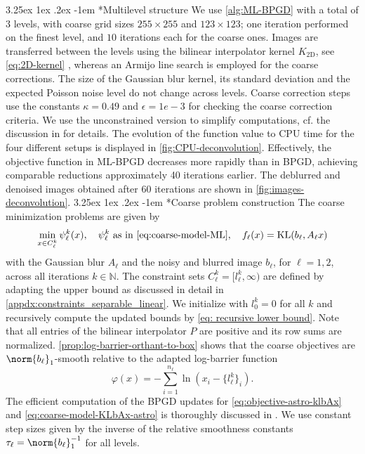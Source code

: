 \documentclass[11pt,reqno]{amsart}
\makeatletter
\numberwithin{equation}{section}
\numberwithin{figure}{section}
\theoremstyle{plain}
\theoremstyle{definition}
\newcommand{\N}{\mathbb{N}}
\newcommand{\vphi}{\varphi}
\DeclareMathOperator{\KL}{KL}
\renewcommand\paragraph{\@startsection{paragraph}{4}{0pt}%
  {3.25ex \@plus 1ex \@minus .2ex}%
  {-1em}
  {\normalfont\itshape}*}
\makeatother
\begin{document}
\paragraph{Multilevel structure} We use \cref{alg:ML-BPGD} with a total of $3$ levels, with coarse grid sizes $255 \times 255$ and $123 \times 123$; one iteration performed on the finest level, and $10$ iterations each for the coarse ones. Images are transferred between the levels using the bilinear interpolator kernel $K_{2{\text{D}}}$, see \eqref{eq:2D-kernel} , whereas an Armijo line search is employed for the coarse corrections.
The size of the Gaussian blur kernel, 
its standard deviation and the expected Poisson noise level do not change across levels.
Coarse correction steps use the constants $\kappa = 0.49$ and $\epsilon = 1e-3$ for checking the coarse correction criteria. We use the unconstrained version to simplify computations, cf. the discussion in  for details. The evolution of the function value to CPU time for the four different setups is displayed in \cref{fig:CPU-deconvolution}. Effectively, the objective function in ML-BPGD decreases more rapidly than in BPGD, achieving comparable reductions approximately 40 iterations earlier. The deblurred and denoised images obtained after 60 iterations are shown in \cref{fig:images-deconvolution}.
\paragraph{Coarse problem construction}
The coarse minimization problems are given by
\begin{equation} \label{eq:coarse-model-KLbAx-astro}
    \min_{x \in C_\ell^k} \psi_{\ell}^k(x), \quad \psi_{\ell}^k \text{ as in } \eqref{eq:coarse-model-ML}, \quad f_\ell(x) = \KL(b_\ell, A_\ell x)    
\end{equation}
with the Gaussian blur $A_\ell$ and the noisy and blurred image $b_\ell$, for $\ell = 1,2$, across all iterations $k \in \N$.
The constraint sets $C_\ell^k = [l_\ell^k, \infty)$ are defined by adapting the upper bound as discussed in detail in \cref{appdx:constraints_separable_linear}. We initialize with $l_0^k = 0$ for all $k$ and recursively compute the updated bounds by \eqref{eq: recursive lower bound}. Note that all entries of the bilinear interpolator $P$ are positive and its row sums are normalized.
\cref{prop:log-barrier-orthant-to-box} shows that the coarse objectives are $\norm{b_\ell}_1$-smooth relative to the 
adapted log-barrier function
\begin{equation}
    \vphi(x) = - \sum_{i = 1}^{n_\ell} \ln (x_i - \{l_\ell^k\}_i).
\end{equation}
The efficient computation of the BPGD updates for \eqref{eq:objective-astro-klbAx} and \eqref{eq:coarse-model-KLbAx-astro} is thoroughly discussed in . We use constant step sizes given by the inverse of the relative smoothness constants $\tau_\ell = \norm{b_\ell}_1^{-1}$ for all levels.
\end{document}
